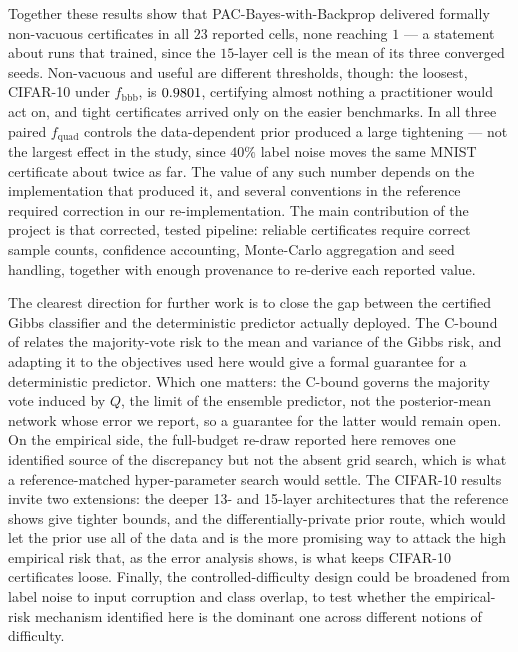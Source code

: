 Together these results show that PAC-Bayes-with-Backprop delivered formally
non-vacuous certificates in all $23$ reported cells, none reaching $1$ --- a
statement about runs that trained, since the $15$-layer cell is the mean of its
three converged seeds. Non-vacuous and useful are different thresholds, though:
the loosest, CIFAR-10 under $f_{\text{bbb}}$, is
$0.9801$, certifying almost nothing a practitioner would
act on, and tight certificates arrived only on the easier benchmarks. In all
three paired $f_{\text{quad}}$ controls the data-dependent prior produced a large
tightening --- not the largest effect in the study, since $40\%$ label noise
moves the same MNIST certificate about twice as far.
The value of any such number depends on the implementation that produced it, and
several conventions in the reference required correction in our
re-implementation. The main contribution of the project is that corrected, tested
pipeline: reliable certificates require correct sample counts, confidence
accounting, Monte-Carlo aggregation and seed handling, together with enough
provenance to re-derive each reported value.

The clearest direction for further work is to close the gap
between the certified Gibbs classifier and the deterministic predictor actually
deployed. The C-bound of \textcite{lacasse2006,germain2015} relates the
majority-vote risk to the mean and variance of the Gibbs risk, and adapting it to
the objectives used here would give a formal guarantee for a deterministic
predictor. Which one matters: the C-bound governs the majority vote induced by
$Q$, the limit of the ensemble predictor, not the posterior-mean network whose
error we report, so a guarantee for the latter would remain open. On
the empirical side, the full-budget re-draw reported here removes one identified
source of the discrepancy but not the absent grid search, which is what a
reference-matched hyper-parameter search would settle.
The CIFAR-10 results invite two extensions: the deeper 13- and 15-layer
architectures that the reference shows give tighter bounds, and the
differentially-private prior route, which would let the prior use all of the data
and is the more promising way to attack the high empirical risk that, as the
error analysis shows, is what keeps CIFAR-10 certificates loose. Finally, the
controlled-difficulty design could be broadened from label noise to input
corruption and class overlap, to test whether the empirical-risk mechanism
identified here is the dominant one across different notions of difficulty.

